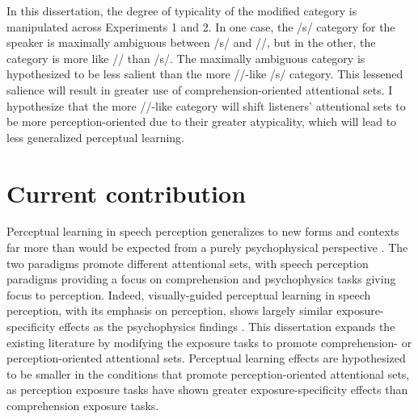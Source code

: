 In this dissertation, the degree of typicality of the modified category is manipulated across Experiments 1 and 2.  
In one case, the /s/ category for the speaker is maximally ambiguous between /s/ and /\textesh/, but in the other, the category is more like /\textesh/ than /s/.
The maximally ambiguous category is hypothesized to be less salient than the more /\textesh/-like /s/ category.
This lessened salience will result in greater use of comprehension-oriented attentional sets.
I hypothesize that the more /\textesh/-like category will shift listeners' attentional sets to be more perception-oriented due to their greater atypicality, which will lead to less generalized perceptual learning.

\section{Current contribution}

Perceptual learning in speech perception generalizes to new forms and contexts far more than would be expected from a purely psychophysical perspective \citep{Norris2003,Gilbert2001}.
The two paradigms promote different attentional sets, with speech perception paradigms providing a focus on comprehension and psychophysics tasks giving focus to perception.  
Indeed, visually-guided perceptual learning in speech perception, with its emphasis on perception, shows largely similar exposure-specificity effects as the psychophysics findings \citep{Reinisch2014}.
This dissertation expands the existing literature by modifying the exposure tasks to promote comprehension- or perception-oriented attentional sets.
Perceptual learning effects are hypothesized to be smaller in the conditions that promote perception-oriented attentional sets, as perception exposure tasks have shown greater exposure-specificity effects than comprehension exposure tasks.

